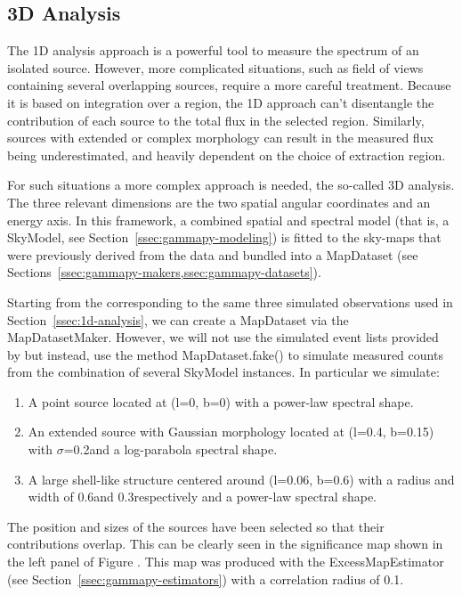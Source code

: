 \subsection{3D Analysis}
\label{ssec:3d-analysis}
The 1D analysis approach is a powerful tool to measure the spectrum of an isolated source. However, more complicated situations, such as field of views containing several overlapping sources, require a more careful treatment. Because it is based on integration over a region, the 1D approach can't disentangle the contribution of each source to the total flux in the selected region. Similarly, sources with extended or complex morphology can result in the measured flux being underestimated, and heavily dependent on the choice of extraction region.

For such situations a more complex approach is needed, the so-called 3D analysis. The three relevant dimensions are the two spatial angular coordinates and an energy axis. In this framework, a combined spatial and spectral model (that is, a SkyModel, see Section~\ref{ssec:gammapy-modeling}) is fitted to the sky-maps that were previously derived from the data and bundled into a MapDataset (see Sections~\ref{ssec:gammapy-makers,ssec:gammapy-datasets}).

Starting from the \irfs corresponding to the same three simulated \cta observations used in Section~\ref{ssec:1d-analysis}, we can create a MapDataset via the MapDatasetMaker. However, we will not use the simulated event lists provided by \cta but instead, use the method MapDataset.fake() to simulate measured counts from the combination of several SkyModel instances. In particular we simulate:
\begin{enumerate}
	\item A point source located at (l=0\textdegree, b=0\textdegree) with a power-law spectral shape.
	\item An extended source with Gaussian morphology located at (l=0.4\textdegree, b=0.15\textdegree) with $\sigma$=0.2\textdegree and a log-parabola spectral shape.
	\item A large shell-like structure centered around (l=0.06\textdegree, b=0.6\textdegree) with a radius and width of 0.6\textdegree and 0.3\textdegree respectively and a power-law spectral shape.
\end{enumerate}
The position and sizes of the sources have been selected so that their contributions overlap. This can be clearly seen in the significance map shown in the left panel of Figure . This map was produced with the ExcessMapEstimator (see Section~\ref{ssec:gammapy-estimators}) with a correlation radius of 0.1\textdegree.

